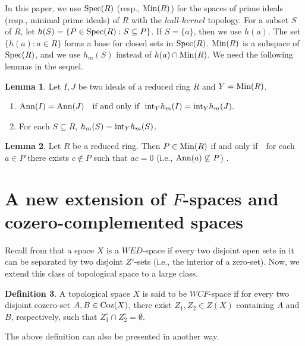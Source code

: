 \documentclass{amsart}
\theoremstyle{definition}
\theoremstyle{remark}
\numberwithin{equation}{section}
\newcommand{\Ann}{{\rm Ann}}
\newcommand{\rint}{{\rm int}}
\newcommand{\coz}{{\rm Coz}}
\newcommand{\Min}{{\rm Min}}
\newcommand{\Spec}{{\rm Spec}}
\newcommand{\cc}{\circ}
\newcommand{\tohi}{\emptyset}
\def\ifif {if and only if\ \ }
\theoremstyle{definition}\newtheorem{thm}{Theorem}[section]
\theoremstyle{definition}\newtheorem{cor}[thm]{Corollary}
\theoremstyle{definition}\newtheorem{lem}[thm]{Lemma}
\theoremstyle{definition}\newtheorem{prop}[thm]{Proposition}
\theoremstyle{definition}\newtheorem{defn}[thm]{Definition}
\theoremstyle{definition}\newtheorem{Rem}[thm]{Remark}
\theoremstyle{remark}\newtheorem{rem}[thm]{Remark}
\theoremstyle{definition}\newtheorem{exam}[thm]{Example}
\theoremstyle{definition}\newtheorem{qu}[thm]{question}
\begin{document}
In this paper, we use $\Spec(R)$ (resp., $\Min(R)$) for the
spaces of prime ideals (resp., minimal prime ideals) of $R$ with the
$hull$-$kernel$ topology. For a subset $S$ of $R$, let $h(S)=\{P\in\Spec(R): S\subseteq P\}$. If $S=\{a\}$, then we use $h(a)$. The set $\{h(a): a\in R\}$ forms a base for closed sets in $\Spec(R)$. $\Min(R)$ is a subspace of $\Spec(R)$, and we use $h_{m}(S)$ instead of   $h(a)\cap\Min(R)$.
We need the following lemmas in the sequel. 
\begin{lem}\label{p3}
Let $I, J$ be two ideals of a reduced ring $R$ and $Y=\Min(R)$. 
\begin{enumerate}
\item $\Ann(I)=\Ann(J)\quad \text{\ifif} \rint_{Y}h_m(I)=\rint_{Y}h_m(J).$

\item For each $S\subseteq R$, $h_m(S)=\rint_{Y}h_m(S)$.
\end{enumerate}
\end{lem}
\begin{lem}\label{p4}
Let $R$ be a reduced ring. Then $P\in\Min(R)$ \ifif for each $a\in P$ there exists $c\not\in P$ such that $ac=0$ (i.e., $\Ann(a)\not\subseteq P$) .
\end{lem}
\section{A new extension of $F$-spaces and  cozero-complemented spaces}
Recall from \cite{AT} that a space $X$ is a $WED$-space if every two disjoint open sets in it can be separated by two disjoint $Z^{\circ}$-sets (i.e., the interior of a zero-set). Now, we extend this class of topological space to a large class. 
\begin{defn}
A topological space $X$ is said to be $WCF$-space if for every two disjoint cozero-set $A,B\in\coz(X)$, there exist $Z_1,Z_2\in Z(X)$ containing $A$ and $B$, respectively, such that $Z_1^\cc\cap Z_2^\cc=\tohi$.
\end{defn}
The above definition can also be presented in another way.
\end{document}
